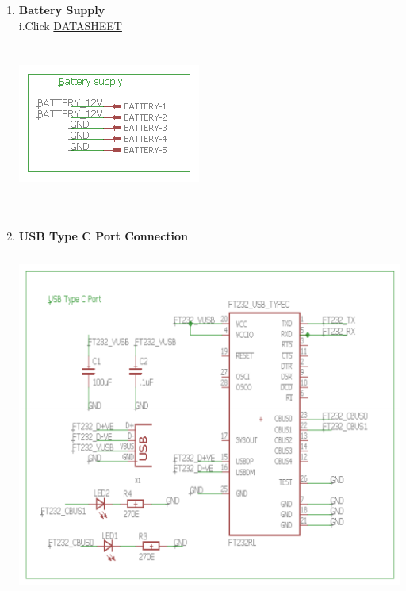 \documentclass[a4paper,12pt,oneside]{book}
\begin{document}
\begin{enumerate}
    
    \newpage\item \textbf{Battery Supply}\\
    i.Click \href{https://system.netsuite.com/core/media/media.nl?id=1760870&c=1327152&h=aaae2543a511565767bc&_xt=.pdf}{DATASHEET}
    \\\hspace*{3cm}\includegraphics[width=6cm, height=6cm]{btsu}
    
     
    \item \textbf{USB Type C Port Connection}\\
    \\\hfill\includegraphics[width=13cm, height=11cm]{usbc}
    
 \end{enumerate}
 
\end{document}
